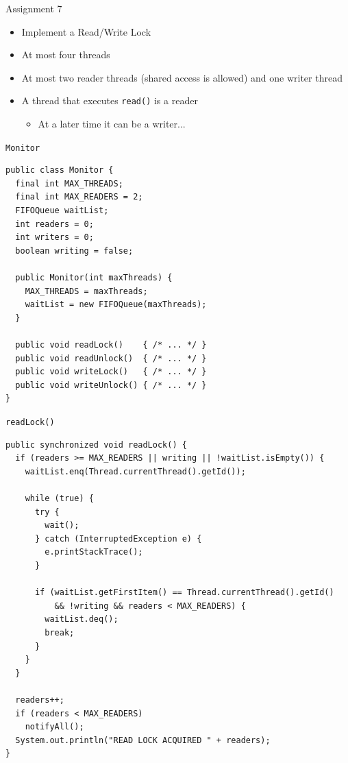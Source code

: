 \begin{frame}{Assignment 7}
  \begin{itemize}
  \item Implement a Read/Write Lock
  \item At most four threads
  \item At most two reader threads (shared access is allowed) and one
    writer thread
  \item A thread that executes \lstinline!read()! is a reader
    \begin{itemize}
    \item At a later time it can be a writer...
    \end{itemize}
  \end{itemize}
\end{frame}

\begin{frame}[fragile]{\lstinline!Monitor!}
\begin{lstlisting}[basicstyle=\fontsize{10}{12}\selectfont\ttfamily]
public class Monitor {
  final int MAX_THREADS;
  final int MAX_READERS = 2;
  FIFOQueue waitList;
  int readers = 0;
  int writers = 0;
  boolean writing = false;
  
  public Monitor(int maxThreads) {
    MAX_THREADS = maxThreads;
    waitList = new FIFOQueue(maxThreads);
  }  
  
  public void readLock()    { /* ... */ }
  public void readUnlock()  { /* ... */ }
  public void writeLock()   { /* ... */ }
  public void writeUnlock() { /* ... */ }
}
\end{lstlisting}
\end{frame}

\begin{frame}[fragile]{\lstinline!readLock()!}
\begin{lstlisting}[basicstyle=\fontsize{7}{9}\selectfont\ttfamily]
public synchronized void readLock() {
  if (readers >= MAX_READERS || writing || !waitList.isEmpty()) {
    waitList.enq(Thread.currentThread().getId());

    while (true) {
      try {
        wait();
      } catch (InterruptedException e) {
        e.printStackTrace();
      }

      if (waitList.getFirstItem() == Thread.currentThread().getId()
          && !writing && readers < MAX_READERS) {
        waitList.deq();
        break;
      }
    }
  }

  readers++;
  if (readers < MAX_READERS)
    notifyAll();
  System.out.println("READ LOCK ACQUIRED " + readers);
}
\end{lstlisting}
\end{frame}

